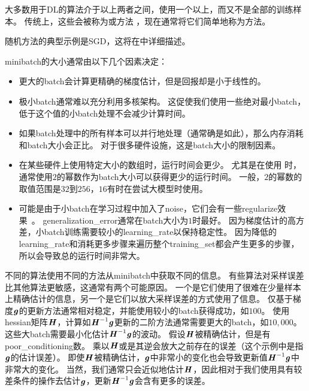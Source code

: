 大多数用于\gls{DL}的算法介于以上两者之间，使用一个以上，而又不是全部的训练样本。
传统上，这些会被称为或方法 ，现在通常将它们简单地称为方法。


随机方法的典型示例是\gls{SGD}，这将在中详细描述。

\gls{minibatch}的大小通常由以下几个因素决定：
\begin{itemize}
    \item 更大的\gls{batch}会计算更精确的梯度估计，但是回报却是小于线性的。
    
    \item 极小\gls{batch}通常难以充分利用多核架构。
    这促使我们使用一些绝对最小\gls{batch}，低于这个值的小\gls{batch}处理不会减少计算时间。
    
    \item 如果\gls{batch}处理中的所有样本可以并行地处理（通常确是如此），那么内存消耗和\gls{batch}大小会正比。
    对于很多硬件设施，这是\gls{batch}大小的限制因素。
    
    \item 在某些硬件上使用特定大小的数组时，运行时间会更少。
    尤其是在使用\,\,时，通常使用$2$的幂数作为\gls{batch}大小可以获得更少的运行时间。
    一般，$2$的幂数的取值范围是$32$到$256$，$16$有时在尝试大模型时使用。
    \item 
    可能是由于小\gls{batch}在学习过程中加入了\gls{noise}，它们会有一些\gls{regularize}效果~\citep{Wilson-2003}。
    \gls{generalization_error}通常在\gls{batch}大小为$1$时最好。
    因为梯度估计的高方差，小\gls{batch}训练需要较小的\gls{learning_rate}以保持稳定性。
    因为降低的\gls{learning_rate}和消耗更多步骤来遍历整个\gls{training_set}都会产生更多的步骤，所以会导致总的运行时间非常大。
\end{itemize}


不同的算法使用不同的方法从\gls{minibatch}中获取不同的信息。
有些算法对采样误差比其他算法更敏感，这通常有两个可能原因。
一个是它们使用了很难在少量样本上精确估计的信息，另一个是它们以放大采样误差的方式使用了信息。
仅基于梯度$\boldsymbol{\mathit{g}}$的更新方法通常相对稳定，并能使用较小的\gls{batch}获得成功，如$100$。
使用\gls{hessian}矩阵$\boldsymbol{\mathit{H}}$，计算如$\boldsymbol{\mathit{H}}^{-1}\boldsymbol{\mathit{g}}$更新的二阶方法通常需要更大的\gls{batch}，如$10,000$。
这些大\gls{batch}需要最小化估计$\boldsymbol{\mathit{H}}^{-1}\boldsymbol{\mathit{g}}$的波动。
假设$\boldsymbol{\mathit{H}}$被精确估计，但是有\gls{poor_conditioning}数。
乘以$\boldsymbol{\mathit{H}}$或是其逆会放大之前存在的误差（这个示例中是指$\boldsymbol{\mathit{g}}$的估计误差）。
即使$\boldsymbol{\mathit{H}}$被精确估计，$\boldsymbol{\mathit{g}}$中非常小的变化也会导致更新值$\boldsymbol{\mathit{H}}^{-1}\boldsymbol{\mathit{g}}$中非常大的变化。
当然，我们通常只会近似地估计$\boldsymbol{\mathit{H}}$，因此相对于我们使用具有较差条件的操作去估计$\boldsymbol{\mathit{g}}$，更新$\boldsymbol{\mathit{H}}^{-1}\boldsymbol{\mathit{g}}$会含有更多的误差。

